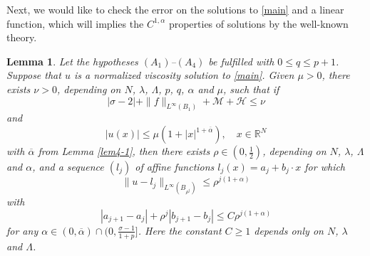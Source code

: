 \documentclass[11pt,reqno]{amsart}
\numberwithin{equation}{section}
\newtheorem{lemma}[theorem]{Lemma}
\begin{document}
Next, we would like to check the error on the solutions to \eqref{main} and a linear function, which will implies the $C^{1,\alpha}$ properties of solutions by the well-known theory.


\begin{lemma}
\label{lem4-2}
Let the hypotheses $(A_1)$--$(A_4)$ be fulfilled with $0\le q\le p+1$. Suppose that $u$ is a normalized viscosity solution to \eqref{main}. Given $\mu>0$, there exists $\nu>0$,
depending on $N$, $\lambda$, $\Lambda$, $p$, $q$, $\alpha$ and $\mu$,  such that if
$$
|\sigma-2|+\|f\|_{L^\infty(B_1)}+\mathcal{M}+\mathcal{H}\leq \nu
$$
and
$$
|u(x)|\le\mu(1+|x|^{1+\overline{\alpha}}), \quad x\in\mathbb{R}^N
$$
with $\overline{\alpha}$ from Lemma \ref{lem4-1}, then there  exists $\rho\in\left(0,\frac{1}{2}\right)$, depending on $N$, $\lambda$, $\Lambda$ and $\alpha$, and a sequence $(l_j)$ of affine functions $l_j(x)=a_j+b_j\cdot x$ for which
\begin{equation}
\label{4-2-0}
\|u-l_j\|_{L^\infty(B_{\rho^j})}\leq \rho^{j(1+\alpha)}
\end{equation}
with
\begin{equation}
\label{4-2-0-1}
|a_{j+1}-a_j|+\rho^j|b_{j+1}-b_j|\leq C\rho^{j(1+\alpha)}
\end{equation}
for any
$\alpha\in(0,\overline{\alpha})\cap \bigl(0,\tfrac{\sigma-1}{1+p}\bigr]$.
Here the constant $C\ge1$ depends only on $N$, $\lambda$ and $\Lambda$.
\end{lemma}
\end{document}
